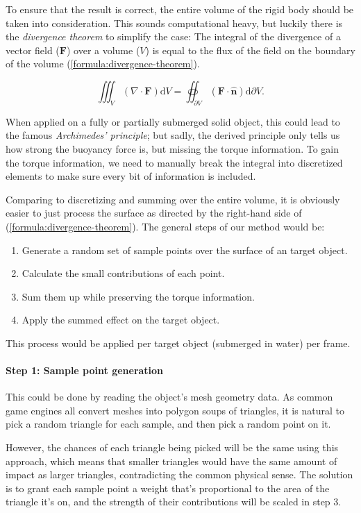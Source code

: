 To ensure that the result is correct, the entire volume of the rigid body should be taken into consideration.
This sounds computational heavy, but luckily there is the \emph{divergence theorem} to simplify the case:
The integral of the divergence of a vector field ($\mathbf{F}$) over a volume ($V$) is equal to the flux of the field on the boundary of the volume (\ref{formula:divergence-theorem}).

\begin{equation}
	\iiint_{V}(\nabla\cdot\mathbf{F})\mathrm{d}V
	=
	\oiint_{\partial V}\left(\mathbf{F}\cdot\hat{\mathbf{n}}\right)\mathrm{d}\partial V
	.
	\label{formula:divergence-theorem}
\end{equation}

When applied on a fully or partially submerged solid object, this could lead to the famous \emph{Archimedes' principle};
but sadly, the derived principle only tells us how strong the buoyancy force is, but missing the torque information.
To gain the torque information, we need to manually break the integral into discretized elements to make sure every bit of information is included.

Comparing to discretizing and summing over the entire volume, it is obviously easier to just process the surface as directed by the right-hand side of (\ref{formula:divergence-theorem}).
The general steps of our method would be:
\begin{enumerate}
	\item Generate a random set of sample points over the surface of an target object.
	\item Calculate the small contributions of each point.
	\item Sum them up while preserving the torque information.
	\item Apply the summed effect on the target object.
\end{enumerate}
This process would be applied per target object (submerged in water) per frame.

\paragraph*{Step 1: Sample point generation}

This could be done by reading the object's mesh geometry data.
As common game engines all convert meshes into polygon soups of triangles, it is natural to pick a random triangle for each sample, and then pick a random point on it.

However, the chances of each triangle being picked will be the same using this approach, which means that smaller triangles would have the same amount of impact as larger triangles, contradicting the common physical sense.
The solution is to grant each sample point a weight that's proportional to the area of the triangle it's on, and the strength of their contributions will be scaled in step 3.

